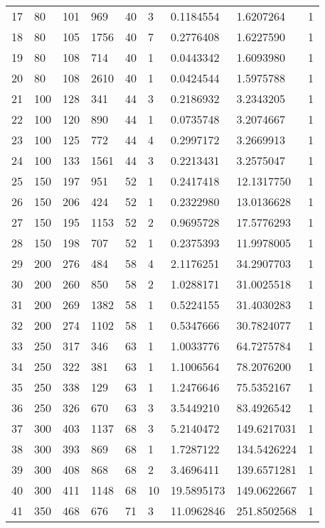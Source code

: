 \begin{longtable}{lllllllll}
  17 & 80 & 101 & 969 & 40 & 3 & 0.1184554 & 1.6207264 & 1 \\
  18 & 80 & 105 & 1756 & 40 & 7 & 0.2776408 & 1.6227590 & 1 \\
  19 & 80 & 108 & 714 & 40 & 1 & 0.0443342 & 1.6093980 & 1 \\
  20 & 80 & 108 & 2610 & 40 & 1 & 0.0424544 & 1.5975788 & 1 \\
  21 & 100 & 128 & 341 & 44 & 3 & 0.2186932 & 3.2343205 & 1 \\
  22 & 100 & 120 & 890 & 44 & 1 & 0.0735748 & 3.2074667 & 1 \\
  23 & 100 & 125 & 772 & 44 & 4 & 0.2997172 & 3.2669913 & 1 \\
  24 & 100 & 133 & 1561 & 44 & 3 & 0.2213431 & 3.2575047 & 1 \\
  25 & 150 & 197 & 951 & 52 & 1 & 0.2417418 & 12.1317750 & 1 \\
  26 & 150 & 206 & 424 & 52 & 1 & 0.2322980 & 13.0136628 & 1 \\
  27 & 150 & 195 & 1153 & 52 & 2 & 0.9695728 & 17.5776293 & 1 \\
  28 & 150 & 198 & 707 & 52 & 1 & 0.2375393 & 11.9978005 & 1 \\
  29 & 200 & 276 & 484 & 58 & 4 & 2.1176251 & 34.2907703 & 1 \\
  30 & 200 & 260 & 850 & 58 & 2 & 1.0288171 & 31.0025518 & 1 \\
  31 & 200 & 269 & 1382 & 58 & 1 & 0.5224155 & 31.4030283 & 1 \\
  32 & 200 & 274 & 1102 & 58 & 1 & 0.5347666 & 30.7824077 & 1 \\
  33 & 250 & 317 & 346 & 63 & 1 & 1.0033776 & 64.7275784 & 1 \\
  34 & 250 & 322 & 381 & 63 & 1 & 1.1006564 & 78.2076200 & 1 \\
  35 & 250 & 338 & 129 & 63 & 1 & 1.2476646 & 75.5352167 & 1 \\
  36 & 250 & 326 & 670 & 63 & 3 & 3.5449210 & 83.4926542 & 1 \\
  37 & 300 & 403 & 1137 & 68 & 3 & 5.2140472 & 149.6217031 & 1 \\
  38 & 300 & 393 & 869 & 68 & 1 & 1.7287122 & 134.5426224 & 1 \\
  39 & 300 & 408 & 868 & 68 & 2 & 3.4696411 & 139.6571281 & 1 \\
  40 & 300 & 411 & 1148 & 68 & 10 & 19.5895173 & 149.0622667 & 1 \\
  41 & 350 & 468 & 676 & 71 & 3 & 11.0962846 & 251.8502568 & 1 \\

\end{longtable}
